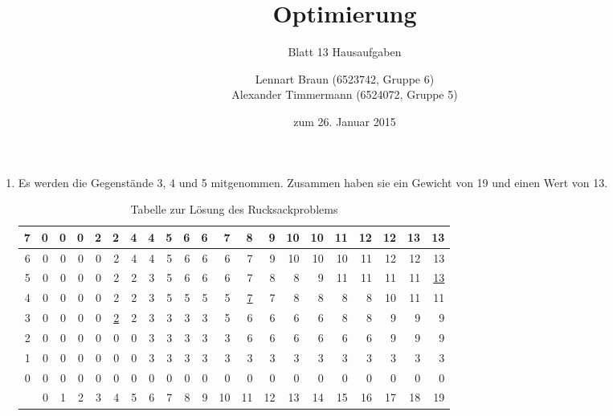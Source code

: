 \documentclass[a4paper]{scrartcl}
\title{Optimierung}
\subtitle{Blatt 13 Hausaufgaben}
\author{
	Lennart Braun (6523742, Gruppe 6) \\
    Alexander Timmermann (6524072, Gruppe 5)
}
\date{zum 26. Januar 2015}
\begin{document}
\maketitle

\begin{enumerate}[label=\bfseries\arabic*.]
    \item
        Es werden die Gegenstände 3, 4 und 5 mitgenommen.
        Zusammen haben sie ein Gewicht von 19 und einen Wert von 13.
        \begin{table}[h]
            \centering
            \begin{tabular}{r|r|r|r|r|r|r|r|r|r|r|r|r|r|r|r|r|r|r|r|r|}
                \hline
                7 & 0 & 0 & 0 & 2 & 2 & 4 & 4 & 5 & 6 & 6 &  7 &  8 &  9 & 10 & 10 & 11 & 12 & 12 & 13 & 13 \\ \hline
                6 & 0 & 0 & 0 & 0 & 2 & 4 & 4 & 5 & 6 & 6 &  6 &  7 &  9 & 10 & 10 & 10 & 11 & 12 & 12 & 13 \\ \hline
                5 & 0 & 0 & 0 & 0 & 2 & 2 & 3 & 5 & 6 & 6 &  6 &  7 &  8 &  8 &  9 & 11 & 11 & 11 & 11 & \underline{13} \\ \hline
                4 & 0 & 0 & 0 & 0 & 2 & 2 & 3 & 5 & 5 & 5 &  5 &  \underline{7} &  7 &  8 &  8 &  8 &  8 & 10 & 11 & 11 \\ \hline
                3 & 0 & 0 & 0 & 0 & \underline{2} & 2 & 3 & 3 & 3 & 3 &  5 &  6 &  6 &  6 &  6 &  8 &  8 &  9 &  9 &  9 \\ \hline
                2 & 0 & 0 & 0 & 0 & 0 & 0 & 3 & 3 & 3 & 3 &  3 &  6 &  6 &  6 &  6 &  6 &  6 &  9 &  9 &  9 \\ \hline
                1 & 0 & 0 & 0 & 0 & 0 & 0 & 3 & 3 & 3 & 3 &  3 &  3 &  3 &  3 &  3 &  3 &  3 &  3 &  3 &  3 \\ \hline
                0 & 0 & 0 & 0 & 0 & 0 & 0 & 0 & 0 & 0 & 0 &  0 &  0 &  0 &  0 &  0 &  0 &  0 &  0 &  0 &  0 \\ \hline
                  & 0 & 1 & 2 & 3 & 4 & 5 & 6 & 7 & 8 & 9 & 10 & 11 & 12 & 13 & 14 & 15 & 16 & 17 & 18 & 19 \\
            \end{tabular}
            \caption{Tabelle zur Lösung des Rucksackproblems}
            \label{tab:rucksack}
        \end{table}


\end{enumerate}
\end{document}
